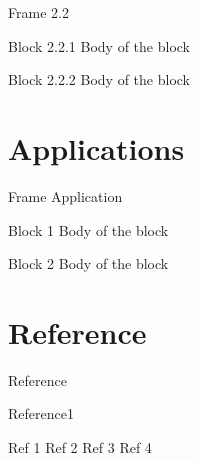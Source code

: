 \documentclass[9pt]{beamer}
\begin{document}
\begin{frame}{Frame 2.2}
    \begin{block}{Block 2.2.1}
    Body of the block
    \end{block}
    
    \pause
    
    \begin{block}{Block 2.2.2}
    Body of the block
    \end{block}
\end{frame}

\section{Applications}

\begin{frame}{Frame Application}
    \begin{block}{Block 1}
    Body of the block
    \end{block}
    
    \pause
    
    \begin{block}{Block 2}
    Body of the block
    \end{block}
\end{frame}

\section{Reference}

\begin{frame}{Reference}
    \begin{block}{Reference1}
    \begin{thebibliography}{1}
     Ref 1
     Ref 2
     Ref 3
     Ref 4
    
    \end{thebibliography}
    \end{block}
\end{frame}
\end{document}
